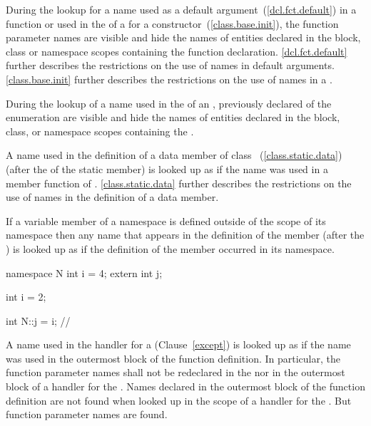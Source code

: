 \pnum
During the lookup for a name used as a default
argument~(\ref{dcl.fct.default}) in a function
 or used in the
 of a  for a
constructor~(\ref{class.base.init}), the function parameter names are
visible and hide the names of entities declared in the block, class or
namespace scopes containing the function declaration. \enternote
\ref{dcl.fct.default} further describes the restrictions on the use of
names in default arguments. \ref{class.base.init} further describes the
restrictions on the use of names in a .
\exitnote

\pnum
During the lookup of a name used in the
 of an ,
previously declared  of the enumeration are visible
and hide the names of entities declared in the block, class, or namespace
scopes containing the .

\pnum
A name used in the definition of a  data member of class
~(\ref{class.static.data}) (after the 
of the static member) is looked up as if the name was used in a member
function of . \enternote \ref{class.static.data} further
describes the restrictions on the use of names in the definition of a
 data member. \exitnote

\pnum
If a variable member of a namespace is defined outside of the scope of
its namespace then any name that appears in the definition of the
member (after the ) is looked up as if the
definition of the member occurred in its namespace.
\enterexample

\begin{codeblock}
namespace N {
  int i = 4;
  extern int j;
}

int i = 2;

int N::j = i;                   // 
\end{codeblock}
\exitexample

\pnum
A name used in the handler for a 
(Clause~\ref{except}) is looked up as if the name was used in the
outermost block of the function definition. In particular, the function
parameter names shall not be redeclared in the
 nor in the outermost block of a handler
for the . Names declared in the outermost
block of the function definition are not found when looked up in the
scope of a handler for the . \enternote But
function parameter names are found. \exitnote

